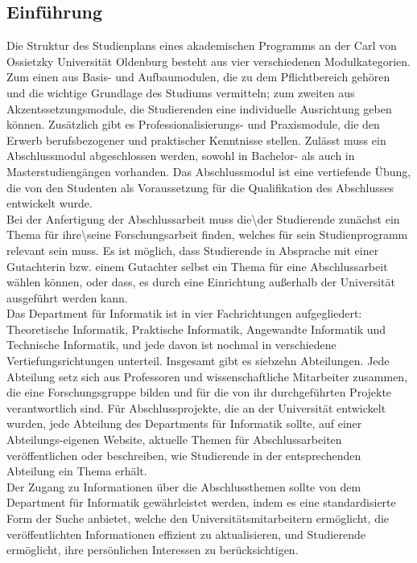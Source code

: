 \subsection{Einführung}
Die Struktur des Studienplans eines akademischen Programms an der Carl von Ossietzky Universit\"at Oldenburg besteht aus vier verschiedenen Modulkategorien. Zum einen aus Basis- und Aufbaumodulen, die zu dem Pflichtbereich geh\"oren und die wichtige Grundlage des Studiums vermitteln; zum zweiten aus Akzentssetzungsmodule, die Studierenden eine individuelle Ausrichtung geben k\"onnen. Zus\"atzlich gibt es Professionalisierungs- und Praxismodule, die den Erwerb berufsbezogener und praktischer Kenntnisse stellen. Zul\"asst muss ein Abschlussmodul abgeschlossen werden, sowohl in Bachelor- als auch in Masterstudieng\"angen vorhanden.
Das Abschlussmodul ist eine vertiefende \"Ubung, die von den Studenten als Voraussetzung f\"ur die Qualifikation des Abschlusses entwickelt wurde\cite{BScInf:2020}.\\

Bei der Anfertigung der Abschlussarbeit muss die\textbackslash der Studierende zun\"achst ein Thema f\"ur ihre\textbackslash seine Forschungsarbeit finden, welches f\"ur sein Studienprogramm relevant sein muss. Es ist m\"oglich, dass Studierende in Absprache mit einer Gutachterin bzw. einem Gutachter selbst ein Thema f\"ur eine Abschlussarbeit w\"ahlen k\"onnen, oder dass, es durch eine Einrichtung au{\ss}erhalb der Universit\"at ausgef\"uhrt werden kann\cite{Boles:2015}.\\

Das Department f\"ur Informatik ist in vier Fachrichtungen aufgegliedert: Theoretische Informatik, Praktische Informatik, Angewandte Informatik und Technische Informatik, und jede davon ist nochmal in verschiedene Vertiefungsrichtungen unterteil. Insgesamt gibt es siebzehn Abteilungen\cite{SpeInf:2020}. Jede Abteilung setz sich aus Professoren und wissenschaftliche Mitarbeiter zusammen, die eine Forschungsgruppe bilden und f\"ur die von ihr durchgef\"uhrten Projekte verantwortlich sind.
F\"ur Abschlussprojekte, die an der Universit\"at entwickelt wurden, jede Abteilung des Departments f\"ur Informatik sollte, auf einer Abteilungs-eigenen Website, aktuelle Themen f\"ur Abschlussarbeiten ver\"offentlichen oder beschreiben, wie Studierende in der entsprechenden Abteilung ein Thema erh\"alt\cite{Boles:2015}.\\

Der Zugang zu Informationen \"uber die Abschlussthemen sollte von dem Department f\"ur Informatik gew\"ahrleistet werden, indem es eine standardisierte Form der Suche anbietet, welche den Universit\"atsmitarbeitern erm\"oglicht, die ver\"offentlichten Informationen effizient zu aktualisieren, und Studierende erm\"oglicht, ihre pers\"onlichen Interessen zu ber\"ucksichtigen.

